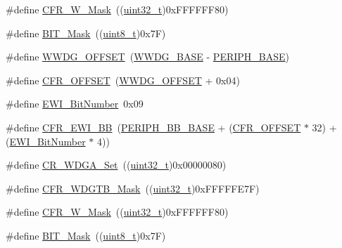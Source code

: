 \begin{DoxyCompactItemize}
\item 
\#define \hyperlink{group___w_w_d_g___private___defines_gac00816db9fe6715f702b4f7d6085ce30}{C\+F\+R\+\_\+\+W\+\_\+\+Mask}~((\hyperlink{_p_e___types_8h_a33594304e786b158f3fb30289278f5af}{uint32\+\_\+t})0x\+F\+F\+F\+F\+F\+F80)
\item 
\#define \hyperlink{group___w_w_d_g___private___defines_ga01a4e07e98e933af78671f65a49bd836}{B\+I\+T\+\_\+\+Mask}~((\hyperlink{_p_e___types_8h_aba7bc1797add20fe3efdf37ced1182c5}{uint8\+\_\+t})0x7\+F)
\item 
\#define \hyperlink{group___w_w_d_g___private___defines_gab6dcdf2385dd7317ec775e146cff40ca}{W\+W\+D\+G\+\_\+\+O\+F\+F\+S\+ET}~(\hyperlink{openmotestm_2library_2inc_2stm32f10x__map_8h_a9a5bf4728ab93dea5b569f5b972cbe62}{W\+W\+D\+G\+\_\+\+B\+A\+SE} -\/ \hyperlink{openmotestm_2library_2inc_2stm32f10x__map_8h_a9171f49478fa86d932f89e78e73b88b0}{P\+E\+R\+I\+P\+H\+\_\+\+B\+A\+SE})
\item 
\#define \hyperlink{group___w_w_d_g___private___defines_ga3e0f9d9f7f69a6d133bba721e25aca4a}{C\+F\+R\+\_\+\+O\+F\+F\+S\+ET}~(\hyperlink{openmotestm_2library_2src_2stm32f10x__wwdg_8c_ab6dcdf2385dd7317ec775e146cff40ca}{W\+W\+D\+G\+\_\+\+O\+F\+F\+S\+ET} + 0x04)
\item 
\#define \hyperlink{group___w_w_d_g___private___defines_ga97c9005823520f5aaefe211923b48215}{E\+W\+I\+\_\+\+Bit\+Number}~0x09
\item 
\#define \hyperlink{group___w_w_d_g___private___defines_gaa48804210cea547f0e0f4ca49c44fc94}{C\+F\+R\+\_\+\+E\+W\+I\+\_\+\+BB}~(\hyperlink{openmotestm_2library_2inc_2stm32f10x__map_8h_aed7efc100877000845c236ccdc9e144a}{P\+E\+R\+I\+P\+H\+\_\+\+B\+B\+\_\+\+B\+A\+SE} + (\hyperlink{openmotestm_2library_2src_2stm32f10x__wwdg_8c_a3e0f9d9f7f69a6d133bba721e25aca4a}{C\+F\+R\+\_\+\+O\+F\+F\+S\+ET} $\ast$ 32) + (\hyperlink{openmotestm_2library_2src_2stm32f10x__wwdg_8c_a97c9005823520f5aaefe211923b48215}{E\+W\+I\+\_\+\+Bit\+Number} $\ast$ 4))
\item 
\#define \hyperlink{group___w_w_d_g___private___defines_ga4c66a66daa0e09782e8b2248db9b35f6}{C\+R\+\_\+\+W\+D\+G\+A\+\_\+\+Set}~((\hyperlink{_p_e___types_8h_a33594304e786b158f3fb30289278f5af}{uint32\+\_\+t})0x00000080)
\item 
\#define \hyperlink{group___w_w_d_g___private___defines_ga2b74f53d33f15b272b2d1ef78a78a2cc}{C\+F\+R\+\_\+\+W\+D\+G\+T\+B\+\_\+\+Mask}~((\hyperlink{_p_e___types_8h_a33594304e786b158f3fb30289278f5af}{uint32\+\_\+t})0x\+F\+F\+F\+F\+F\+E7\+F)
\item 
\#define \hyperlink{group___w_w_d_g___private___defines_gac00816db9fe6715f702b4f7d6085ce30}{C\+F\+R\+\_\+\+W\+\_\+\+Mask}~((\hyperlink{_p_e___types_8h_a33594304e786b158f3fb30289278f5af}{uint32\+\_\+t})0x\+F\+F\+F\+F\+F\+F80)
\item 
\#define \hyperlink{group___w_w_d_g___private___defines_ga01a4e07e98e933af78671f65a49bd836}{B\+I\+T\+\_\+\+Mask}~((\hyperlink{_p_e___types_8h_aba7bc1797add20fe3efdf37ced1182c5}{uint8\+\_\+t})0x7\+F)
\end{DoxyCompactItemize}


